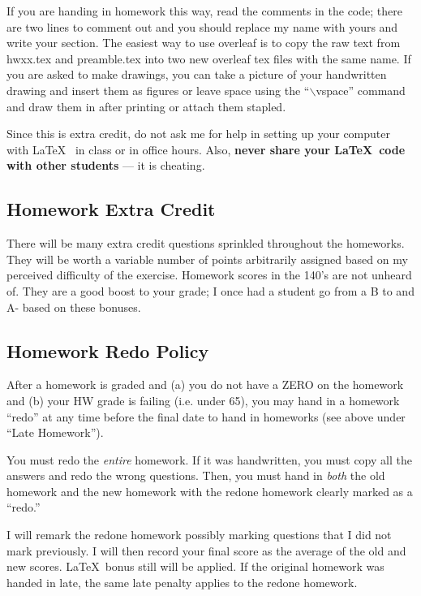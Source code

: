 \documentclass[12pt]{article}
\newcommand{\qu}[1]{``#1''}
\begin{document}
If you are handing in homework this way, read the comments in the code; there are two lines to comment out and you should replace my name with yours and write your section. The easiest way to use overleaf is to copy the raw text from hwxx.tex and preamble.tex into two new overleaf tex files with the same name. If you are asked to make drawings, you can take a picture of your handwritten drawing and insert them as figures or leave space using the \qu{$\backslash$vspace} command and draw them in after printing or attach them stapled.

Since this is extra credit, do not ask me for help in setting up your computer with \LaTeX~ in class or in office hours. Also, \textbf{never share your \LaTeX~code with other students} --- it is cheating.

\subsection*{Homework Extra Credit}

There will be many extra credit questions sprinkled throughout the homeworks. They will be worth a variable number of points arbitrarily assigned based on my perceived difficulty of the exercise. Homework scores in the 140's are not unheard of. They are a good boost to your grade; I once had a student go from a B to and A- based on these bonuses.

\subsection*{Homework Redo Policy}

After a homework is graded and (a) you do not have a ZERO on the homework and (b) your HW grade is failing (i.e. under 65), you may hand in a homework \qu{redo} at any time before the final date to hand in homeworks (see above under \qu{Late Homework}). 

You must redo the \textit{entire} homework. If it was handwritten, you must copy all the answers and redo the wrong questions. Then, you must hand in \textit{both} the old homework and the new homework with the redone homework clearly marked as a \qu{redo.}

I will remark the redone homework possibly marking questions that I did not mark previously. I will then record your final score as the average of the old and new scores. \LaTeX~bonus still will be applied. If the original homework was handed in late, the same late penalty applies to the redone homework.
\end{document}
